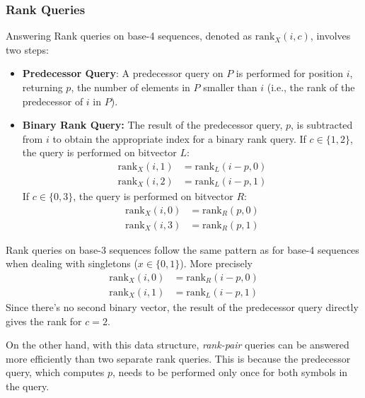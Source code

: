 \subsubsection*{Rank Queries}

Answering Rank queries on base-4 sequences, denoted as \(\textrm{rank}_X(i, c)\), involves two steps:

\begin{itemize}
    \item \textbf{Predecessor Query}: A predecessor query on \(P\) is performed for position \(i\), returning \(p\), the number of elements in \(P\) smaller than \(i\) (i.e., the rank of the predecessor of \(i\) in \(P\)).

    \item \textbf{Binary Rank Query:}  The result of the predecessor query, \(p\), is subtracted from \(i\) to obtain the appropriate index for a binary rank query. If \(c \in \{1, 2\}\), the query is performed on bitvector \(L\):
          \begin{align}
              \textrm{rank}_X(i, 1) & = \textrm{rank}_L(i-p, 0) \\
              \textrm{rank}_X(i, 2) & = \textrm{rank}_L(i-p, 1)
          \end{align}
          If \(c \in \{0, 3\}\), the query is performed on bitvector \(R\):
          \begin{align}
              \textrm{rank}_X(i, 0) & = \textrm{rank}_R(p, 0) \\
              \textrm{rank}_X(i, 3) & = \textrm{rank}_R(p, 1)
          \end{align}
\end{itemize}

\noindent Rank queries on base-3 sequences follow the same pattern as for base-4 sequences when dealing with singletons (\(x \in \{0,1\}\)). More precisely
\begin{align}
    \textrm{rank}_X(i, 0) & = \textrm{rank}_R(i-p, 0) \\
    \textrm{rank}_X(i, 1) & = \textrm{rank}_L(i-p, 1)
\end{align}
\noindent Since there's no second binary vector, the result of the predecessor query directly gives the rank for \(c=2\).

\noindent On the other hand, with this data structure, \emph{rank-pair} queries can be answered more efficiently than two separate rank queries. This is because the predecessor query, which computes \(p\), needs to be performed only once for both symbols in the query.


